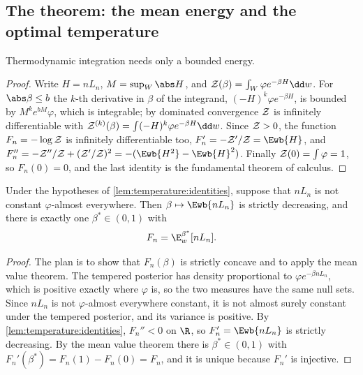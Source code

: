 \begin{refsection}
\section{The theorem: the mean energy and the optimal temperature}\label{sec:temperature:mean}

Thermodynamic integration needs only a bounded energy.


\begin{proof}
Write $H=nL_n$, $M=\sup_W\abs H$, and $\temperatureZ(\beta)=\int_W\varphi e^{-\beta H}\dd w$. For $\abs\beta\le b$ the $k$-th derivative in $\beta$ of the integrand, $(-H)^k\varphi e^{-\beta H}$, is bounded by $M^ke^{bM}\varphi$, which is integrable; by dominated convergence $\mathcal{Z}$ is infinitely differentiable with $\temperatureZ^{(k)}(\beta)=\int(-H)^k\varphi e^{-\beta H}\dd w$. Since $\mathcal{Z}>0$, the function $F_n=-\log\mathcal{Z}$ is infinitely differentiable too, $F_n'=-\temperatureZ'/\temperatureZ=\Ewb{H}$, and $F_n''=-\temperatureZ''/\temperatureZ+(\temperatureZ'/\temperatureZ)^2=-(\Ewb{H^2}-\Ewb{H}^2)$. Finally $\mathcal{Z}(0)=\int\varphi=1$, so $F_n(0)=0$, and the last identity is the fundamental theorem of calculus.
\end{proof}

\begin{theorem}\label{thm:temperature:optimal}
Under the hypotheses of \cref{lem:temperature:identities}, suppose that $nL_n$ is not constant $\varphi$-almost everywhere. Then $\beta\mapsto\Ewb{nL_n}$ is strictly decreasing, and there is exactly one $\beta^*\in(0,1)$ with
\[
F_n=\E^{\beta^*}_w[nL_n].
\]
\end{theorem}

\begin{proof}
The plan is to show that $F_n(\beta)$ is strictly concave and to apply the mean value theorem. The tempered posterior has density proportional to $\varphi e^{-\beta nL_n}$, which is positive exactly where $\varphi$ is, so the two measures have the same null sets. Since $nL_n$ is not $\varphi$-almost everywhere constant, it is not almost surely constant under the tempered posterior, and its variance is positive. By \cref{lem:temperature:identities}, $F_n''<0$ on $\R$, so $F_n'=\Ewb{nL_n}$ is strictly decreasing. By the mean value theorem there is $\beta^*\in(0,1)$ with $F_n'(\beta^*)=F_n(1)-F_n(0)=F_n$, and it is unique because $F_n'$ is injective.
\end{proof}


\end{refsection}
